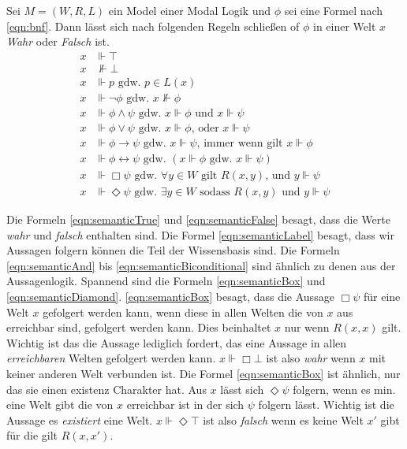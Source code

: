 \begin{definition}
	\label{def:reasoning}
	Sei $M = (W,R,L)$ ein Model einer Modal Logik und $\phi$ sei eine Formel nach \eqref{eqn:bnf}.
	Dann lässt sich nach folgenden Regeln schließen of $\phi$ in einer Welt $x$ \emph{Wahr} oder \emph{Falsch} ist.
	\begin{align}
		x &\Vdash \top\label{eqn:semanticTrue}\\
		x &\nVdash \bot\label{eqn:semanticFalse}\\
		x &\Vdash p\text{ gdw. }p \in L(x)\label{eqn:semanticLabel}\\
		x &\Vdash \neg \phi\text{ gdw. }x \nVdash \phi\\
		x &\Vdash \phi \wedge \psi\text{ gdw. }x \Vdash \phi\text{ und } x \Vdash \psi\label{eqn:semanticAnd}\\
		x &\Vdash \phi \vee \psi\text{ gdw. }x \Vdash \phi \text{, oder } x \Vdash \psi\\
		x &\Vdash \phi \rightarrow \psi\text{ gdw. }x \Vdash \psi\text{, immer wenn gilt }x \Vdash \phi\\
		x &\Vdash \phi \leftrightarrow \psi\text{ gdw. }( x \Vdash \phi\text{ gdw. }x \Vdash \psi)\label{eqn:semanticBiconditional}\\
		x &\Vdash \Box \psi \text{ gdw. }\forall y \in W \text{ gilt } R(x,y)\text{, und } y \Vdash \psi\label{eqn:semanticBox}\\
		x &\Vdash \Diamond \psi\text{ gdw. }\exists y \in W \text{ sodass }R(x,y)\text{ und }y \Vdash \psi\label{eqn:semanticDiamond}
	\end{align}	
\end{definition}
\cite[S.310]{huth2004logic}

Die Formeln \eqref{eqn:semanticTrue} und \eqref{eqn:semanticFalse} besagt, dass die Werte \emph{wahr} und \emph{falsch} enthalten sind. 
Die Formel \eqref{eqn:semanticLabel} besagt, dass wir Aussagen folgern können die Teil der Wissensbasis sind.
Die Formeln \eqref{eqn:semanticAnd} bis \eqref{eqn:semanticBiconditional} sind ähnlich zu denen aus der Aussagenlogik.
Spannend sind die Formeln \eqref{eqn:semanticBox} und \eqref{eqn:semanticDiamond}. 
\eqref{eqn:semanticBox} besagt, dass die Aussage $\Box\psi$ für eine Welt $x$ gefolgert werden kann, wenn diese in allen Welten die von $x$ aus erreichbar sind, gefolgert werden kann. Dies beinhaltet $x$ nur wenn $R(x,x)$ gilt.
Wichtig ist das die Aussage lediglich fordert, das eine Aussage in allen \emph{erreichbaren} Welten gefolgert werden kann. $x \Vdash \Box \bot$ ist also \emph{wahr} wenn $x$ mit keiner anderen Welt verbunden ist.
Die Formel \eqref{eqn:semanticBox} ist ähnlich, nur das sie einen existenz Charakter hat. Aus $x$ lässt sich $\Diamond \psi$ folgern, wenn es min. eine Welt gibt die von $x$ erreichbar ist in der sich $\psi$ folgern lässt. Wichtig ist die Aussage es \emph{existiert} eine Welt. $x \Vdash \Diamond \top$ ist also \emph{falsch} wenn es keine Welt $x'$ gibt für die gilt $R(x,x')$.

